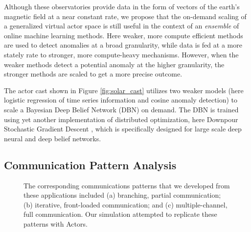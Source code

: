 \documentclass[conference,twocolumn,10pt]{IEEEtran}
\begin{document}
Although these observatories provide data in the form of vectors of the earth's magnetic field at a near constant rate, we propose that the on-demand scaling of a generalized virtual actor space is still useful in the context of an \textit{ensemble} of online machine learning methods. Here weaker, more compute efficient methods are used to detect anomalies at a broad granularity, while data is fed at a more stately rate to stronger, more compute-heavy mechanisms. However, when the weaker methods detect a potential anomaly at the higher granularity, the stronger methods are scaled to get a more precise outcome.

The actor cast shown in Figure \ref{fig:solar_cast} utilizes two weaker models (here logistic regression of time series information and cosine anomaly detection) to scale a Bayesian Deep Belief Network (DBN) on demand. The DBN is trained using yet another implementation of distributed optimization, here Downpour Stochastic Gradient Descent \cite{dean_large_2012}, which is specifically designed for large scale deep neural and deep belief networks.

\subsection{Communication Pattern Analysis}

\begin{figure}[!t]
    \centering
    \hfil
    \hfil
    \caption{The corresponding communications patterns that we developed from these applications included (a) branching, partial communication; (b) iterative, front-loaded communication; and (c) multiple-channel, full communication. Our simulation attempted to replicate these patterns with Actors.}
    \label{fig:communications_patterns}
\end{figure}
\end{document}
